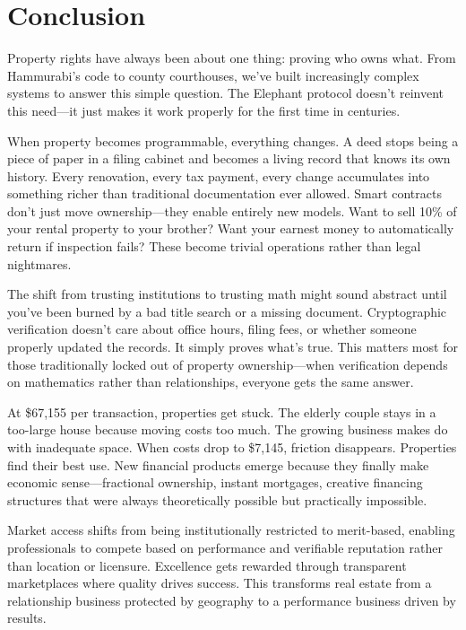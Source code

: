 \chapter{Conclusion}

Property rights have always been about one thing: proving who owns what. From Hammurabi's code to county courthouses, we've built increasingly complex systems to answer this simple question. The Elephant protocol doesn't reinvent this need—it just makes it work properly for the first time in centuries.

When property becomes programmable, everything changes. A deed stops being a piece of paper in a filing cabinet and becomes a living record that knows its own history. Every renovation, every tax payment, every change accumulates into something richer than traditional documentation ever allowed. Smart contracts don't just move ownership—they enable entirely new models. Want to sell 10\% of your rental property to your brother? Want your earnest money to automatically return if inspection fails? These become trivial operations rather than legal nightmares.

The shift from trusting institutions to trusting math might sound abstract until you've been burned by a bad title search or a missing document. Cryptographic verification doesn't care about office hours, filing fees, or whether someone properly updated the records. It simply proves what's true. This matters most for those traditionally locked out of property ownership—when verification depends on mathematics rather than relationships, everyone gets the same answer.

At \$67,155 per transaction, properties get stuck. The elderly couple stays in a too-large house because moving costs too much. The growing business makes do with inadequate space. When costs drop to \$7,145, friction disappears. Properties find their best use. New financial products emerge because they finally make economic sense—fractional ownership, instant mortgages, creative financing structures that were always theoretically possible but practically impossible.

Market access shifts from being institutionally restricted to merit-based, enabling professionals to compete based on performance and verifiable reputation rather than location or licensure. Excellence gets rewarded through transparent marketplaces where quality drives success. This transforms real estate from a relationship business protected by geography to a performance business driven by results.

